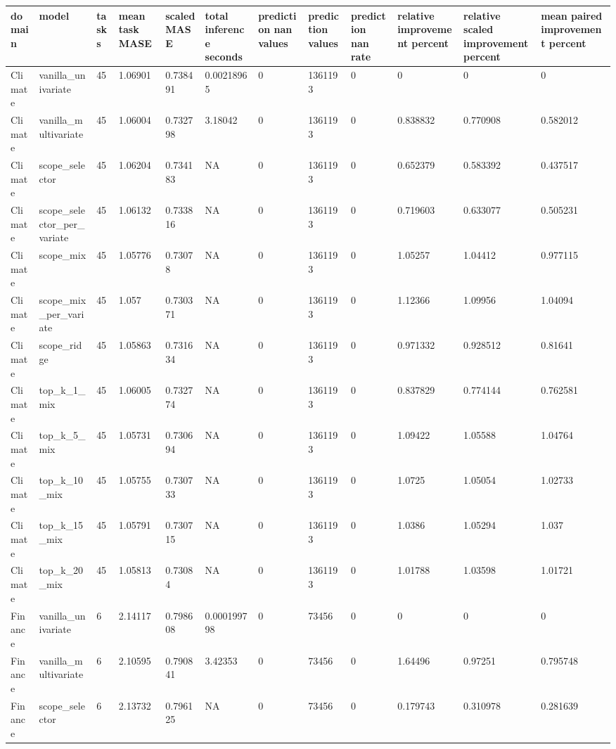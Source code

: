 \begin{tabular}{llllllllllll}
\toprule
domain & model & tasks & mean task MASE & scaled MASE & total inference seconds & prediction nan values & prediction values & prediction nan rate & relative improvement percent & relative scaled improvement percent & mean paired improvement percent \\
\midrule
Climate & vanilla\_univariate & 45 & 1.06901 & 0.738491 & 0.00218965 & 0 & 1361193 & 0 & 0 & 0 & 0 \\
Climate & vanilla\_multivariate & 45 & 1.06004 & 0.732798 & 3.18042 & 0 & 1361193 & 0 & 0.838832 & 0.770908 & 0.582012 \\
Climate & scope\_selector & 45 & 1.06204 & 0.734183 & NA & 0 & 1361193 & 0 & 0.652379 & 0.583392 & 0.437517 \\
Climate & scope\_selector\_per\_variate & 45 & 1.06132 & 0.733816 & NA & 0 & 1361193 & 0 & 0.719603 & 0.633077 & 0.505231 \\
Climate & scope\_mix & 45 & 1.05776 & 0.73078 & NA & 0 & 1361193 & 0 & 1.05257 & 1.04412 & 0.977115 \\
Climate & scope\_mix\_per\_variate & 45 & 1.057 & 0.730371 & NA & 0 & 1361193 & 0 & 1.12366 & 1.09956 & 1.04094 \\
Climate & scope\_ridge & 45 & 1.05863 & 0.731634 & NA & 0 & 1361193 & 0 & 0.971332 & 0.928512 & 0.81641 \\
Climate & top\_k\_1\_mix & 45 & 1.06005 & 0.732774 & NA & 0 & 1361193 & 0 & 0.837829 & 0.774144 & 0.762581 \\
Climate & top\_k\_5\_mix & 45 & 1.05731 & 0.730694 & NA & 0 & 1361193 & 0 & 1.09422 & 1.05588 & 1.04764 \\
Climate & top\_k\_10\_mix & 45 & 1.05755 & 0.730733 & NA & 0 & 1361193 & 0 & 1.0725 & 1.05054 & 1.02733 \\
Climate & top\_k\_15\_mix & 45 & 1.05791 & 0.730715 & NA & 0 & 1361193 & 0 & 1.0386 & 1.05294 & 1.037 \\
Climate & top\_k\_20\_mix & 45 & 1.05813 & 0.73084 & NA & 0 & 1361193 & 0 & 1.01788 & 1.03598 & 1.01721 \\
Finance & vanilla\_univariate & 6 & 2.14117 & 0.798608 & 0.000199798 & 0 & 73456 & 0 & 0 & 0 & 0 \\
Finance & vanilla\_multivariate & 6 & 2.10595 & 0.790841 & 3.42353 & 0 & 73456 & 0 & 1.64496 & 0.97251 & 0.795748 \\
Finance & scope\_selector & 6 & 2.13732 & 0.796125 & NA & 0 & 73456 & 0 & 0.179743 & 0.310978 & 0.281639 \\

\end{tabular}
